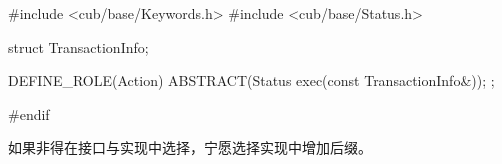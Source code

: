 \begin{content}
\begin{leftbar}
\begin{c++}[caption={\ttfamily{trans-dsl/sched/IAction.h}}]
#include <cub/base/Keywords.h>
#include <cub/base/Status.h>

struct TransactionInfo;

DEFINE_ROLE(Action)
{
    ABSTRACT(Status exec(const TransactionInfo&));
};

#endif
\end{c++}
\end{leftbar}

如果非得在接口与实现中选择，宁愿选择实现中增加后缀。

\end{content}

